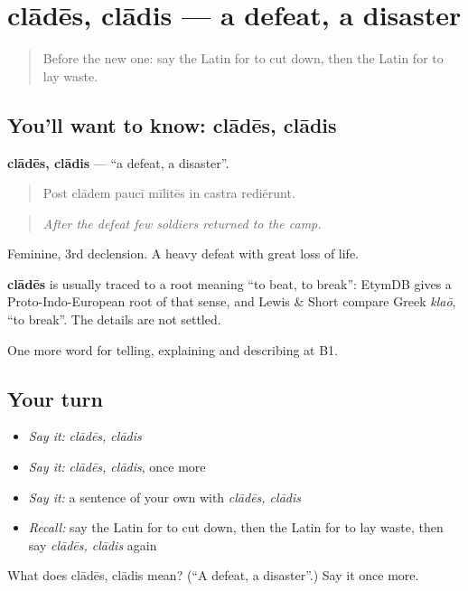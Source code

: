 \section[clādēs, clādis]{clādēs, clādis — a defeat, a disaster}

\label{lesson:LA-C342-clades}



\begin{quote}
Before the new one: say the Latin for to cut down, then the Latin for to lay waste.
\end{quote}

\subsection*{You'll want to know: clādēs, clādis}
\textbf{clādēs, clādis} — \textquotedblleft{}a defeat, a disaster\textquotedblright{}.

\begin{quote}
Post clādem paucī mīlitēs in castra rediērunt.
\end{quote}

\begin{quote}
\emph{After the defeat few soldiers returned to the camp.}
\end{quote}

Feminine, 3rd declension. A heavy defeat with great loss of life.

\begin{cousinweb}
\textbf{clādēs} is usually traced to a root meaning \textquotedblleft{}to beat, to break\textquotedblright{}: EtymDB gives a Proto-Indo-European root of that sense, and Lewis \& Short compare Greek \emph{klaō}, \textquotedblleft{}to break\textquotedblright{}. The details are not settled.
\end{cousinweb}

\begin{grammarlens}[title={What you've built}]
One more word for telling, explaining and describing at B1.
\end{grammarlens}

\subsection*{Your turn}
\begin{itemize}
\raggedright
  \item \emph{Say it:} \emph{clādēs, clādis}
  \item \emph{Say it:} \emph{clādēs, clādis}, once more
  \item \emph{Say it:} a sentence of your own with \emph{clādēs, clādis}
  \item \emph{Recall:} say the Latin for to cut down, then the Latin for to lay waste, then say \emph{clādēs, clādis} again
\end{itemize}

\begin{tcolorbox}[breakable,colback=teal!4,colframe=teal!35!black,title={Before you move on}]
What does clādēs, clādis mean? (\textquotedblleft{}A defeat, a disaster\textquotedblright{}.) Say it once more.
\end{tcolorbox}
